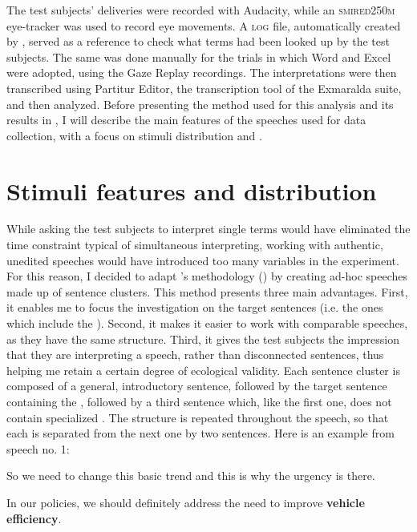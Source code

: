 \documentclass[output=paper]{langsci/langscibook}
\begin{document}
The test subjects’ deliveries were recorded with Audacity, while an \textsc{smi\linebreak red250m} eye-tracker was used to record eye movements. A \textsc{log} file, automatically created by , served as a reference to check what terms had been looked up by the test subjects. The same was done manually for the trials in which Word and Excel were adopted, using the Gaze Replay recordings. The interpretations were then transcribed using Partitur Editor, the transcription tool of the Exmaralda suite, and then analyzed. Before presenting the method used for this analysis and its results in , I will describe the main features of the speeches used for data collection, with a focus on stimuli distribution and .

\section{Stimuli features and distribution}\label{sec:prandi:4}
While asking the test subjects to interpret single terms would have eliminated the time constraint typical of simultaneous interpreting, working with authentic, unedited speeches would have introduced too many variables in the experiment. For this reason, I decided to adapt \citeauthor{Seeber2011a}’s methodology (\citeyear{Seeber2011a}) by creating ad-hoc speeches made up of sentence clusters. This method presents three main advantages. First, it enables me to focus the investigation on the target sentences (i.e. the ones which include the ). Second, it makes it easier to work with comparable speeches, as they have the same structure. Third, it gives the test subjects the impression that they are interpreting a speech, rather than disconnected sentences, thus helping me retain a certain degree of ecological validity. Each sentence cluster is composed of a general, introductory sentence, followed by the target sentence containing the , followed by a third sentence which, like the first one, does not contain specialized . The structure is repeated throughout the speech, so that each  is separated from the next one by two sentences. Here is an example from speech no. 1:

\ea
So we need to change this basic trend and this is why the urgency is there.

In our policies, we should definitely address the need to improve \textbf{vehicle efficiency}.
\end{document}

